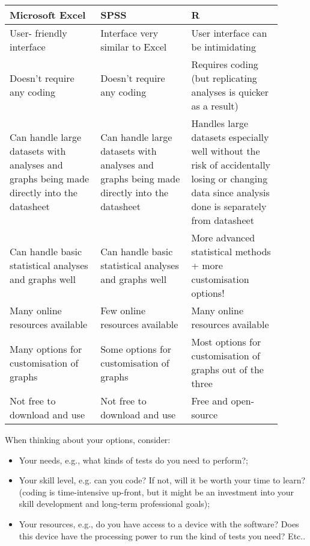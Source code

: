 \documentclass{article}
\begin{document}
\begin{center}
\begin{tabular}{ |>{\centering\arraybackslash}p{0.3\linewidth} |>{\centering\arraybackslash} p{0.3\linewidth}| >{\centering\arraybackslash}p{0.3\linewidth}|} 
 \hline
 \textbf{Microsoft Excel} & \textbf{SPSS} & \textbf{R}\\ 
    \hline
 User- friendly interface & Interface very similar to Excel & User interface can be intimidating\\ 
 \hline
 Doesn’t require any coding & Doesn’t require any coding & Requires coding (but replicating analyses is quicker as a result)\\ 
 \hline
 Can handle large datasets with analyses and graphs being made directly into the datasheet & Can handle large datasets with analyses and graphs being made directly into the datasheet & Handles large datasets especially well without the risk of accidentally losing or changing data since analysis done is separately from datasheet\\
 \hline
 Can handle basic statistical analyses and graphs well & Can handle basic statistical analyses and graphs well & More advanced statistical methods + more customisation options!\\
 \hline
 Many online resources available & Few online resources available & Many online resources available\\
 \hline
 Many options for customisation of graphs & Some options for customisation of graphs & Most options for customisation of graphs out of the three\\
 \hline
 Not free to download and use & Not free to download and use & Free and open-source\\
\hline
\end{tabular}
\end{center}

\vspace{0.5cm}

When thinking about your options, consider:

\begin{itemize}
    \item Your needs, e.g., what kinds of tests do you need to perform?;
    
    \item Your skill level, e.g. can you code? If not, will it be worth your time to learn? (coding is time-intensive up-front, but it might be an investment into your skill development and long-term professional goals);
    
    \item Your resources, e.g., do you have access to a device with the software? Does this device have the processing power to run the kind of tests you need? Etc..
\end{itemize}
\end{document}
